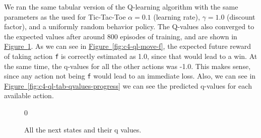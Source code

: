 \documentclass{article}
\begin{document}
We ran the same tabular version of the Q-learning algorithm with the same parameters as the used for
Tic-Tac-Toe $\alpha=0.1$ (learning rate), $\gamma=1.0$ (discount factor), and a uniformly random
behavior policy. The Q-values also converged to the expected values after around 800 episodes of
training, and are shown in \hyperref[fig:c4-ql-qvalues] {Figure~\ref*{fig:c4-ql-qvalues}}. As we can
see in \hyperref[fig:c4-ql-move-f] {Figure~\ref*{fig:c4-ql-move-f}}, the expected future reward of
taking action \texttt{f} is correctly estimated as 1.0, since that would lead to a win. At the same
time, the q-values for all the other actions was -1.0. This makes sense, since any action not being
\texttt{f} would lead to an immediate loss. Also, we can see in
\hyperref[fig:c4-ql-tab-qvalues-progress] {Figure~\ref*{fig:c4-ql-tab-qvalues-progress}} we can see
the predicted q-values for each available action. 


\begin{figure}[!h]
    \centering
     \hspace{0.1in}
     \hspace{0.1in}0
    \caption{All the next states and their q values.}
    \label{fig:c4-ql-qvalues}
\end{figure}
\end{document}
